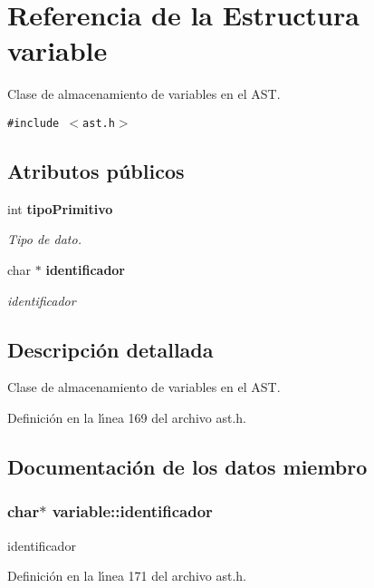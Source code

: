 \section{Referencia de la Estructura variable}
\label{structvariable}
Clase de almacenamiento de variables en el AST.  


{\tt \#include $<$ast.h$>$}

\subsection*{Atributos p\'{u}blicos}
\begin{CompactItemize}
\item 
int {\bf tipo\-Primitivo}
\begin{CompactList}\small\item\em Tipo de dato. \item\end{CompactList}\item 
char $\ast$ {\bf identificador}
\begin{CompactList}\small\item\em identificador \item\end{CompactList}\end{CompactItemize}


\subsection{Descripci\'{o}n detallada}
Clase de almacenamiento de variables en el AST. 



Definici\'{o}n en la l\'{\i}nea 169 del archivo ast.h.

\subsection{Documentaci\'{o}n de los datos miembro}
\subsubsection{\setlength{\rightskip}{0pt plus 5cm}char$\ast$ {\bf variable::identificador}}\label{structvariable_o1}


identificador 



Definici\'{o}n en la l\'{\i}nea 171 del archivo ast.h.


